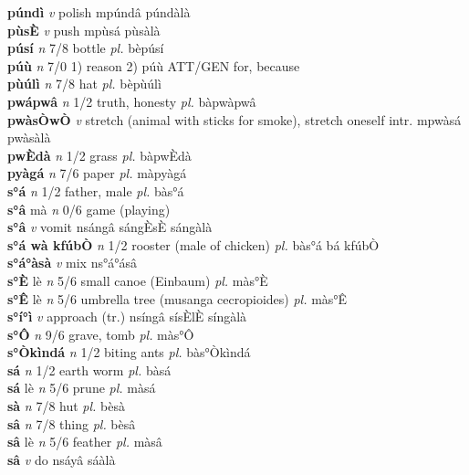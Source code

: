 \documentclass{article}
\begin{document}
{\bf púndì}  {\it v} polish   mpúndâ   púndàlà   \\ 
{\bf pùsÈ}  {\it v} push   mpùsá   pùsàlà   \\ 
{\bf púsí}  {\it n} 7/8 bottle {\it pl.} bèpúsí         \\ 
{\bf púù}  {\it n} 7/0 1) reason 2) púù ATT/GEN for, because         \\ 
{\bf pùúlì}  {\it n} 7/8 hat {\it pl.} bèpùúlì         \\ 
{\bf pwápwâ}  {\it n} 1/2 truth, honesty {\it pl.} bàpwàpwâ         \\ 
{\bf pwàsÒwÒ}  {\it v} stretch (animal with sticks for smoke), stretch oneself intr.   mpwàsá   pwàsàlà   \\ 
{\bf pwÈdà}  {\it n} 1/2 grass {\it pl.} bàpwÈdà         \\ 
{\bf pyàgá}  {\it n} 7/6 paper {\it pl.} màpyàgá         \\ 
{\bf s°á}  {\it n} 1/2 father, male {\it pl.} bàs°á         \\ 
{\bf s°â} mà {\it n} 0/6 game (playing)         \\ 
{\bf s°â}  {\it v} vomit   nsángâ  sángÈsÈ sángàlà   \\ 
{\bf s°á wà kfúbÒ}  {\it n} 1/2 rooster (male of chicken) {\it pl.} bàs°á bá kfúbÒ         \\ 
{\bf s°á°àsà}  {\it v} mix   ns°á°ásâ      \\ 
{\bf s°È} lè {\it n} 5/6 small canoe (Einbaum) {\it pl.} màs°È         \\ 
{\bf s°Ê} lè {\it n} 5/6 umbrella tree (musanga cecropioides) {\it pl.} màs°Ê         \\ 
{\bf s°í°ì}  {\it v} approach (tr.)   nsíngâ sísÈlÈ  síngàlà   \\ 
{\bf s°Ô}  {\it n} 9/6 grave, tomb {\it pl.} màs°Ô         \\ 
{\bf s°Òkìndá}  {\it n} 1/2 biting ants {\it pl.} bàs°Òkìndá         \\ 
{\bf sá}   {\it n} 1/2 earth worm {\it pl.} bàsá         \\ 
{\bf sá} lè {\it n} 5/6 prune {\it pl.} màsá         \\ 
{\bf sà}  {\it n} 7/8 hut {\it pl.} bèsà         \\ 
{\bf sâ}  {\it n} 7/8 thing {\it pl.} bèsâ         \\ 
{\bf sâ} lè {\it n} 5/6 feather {\it pl.} màsâ         \\ 
{\bf sâ}  {\it v} do   nsáyâ   sáàlà   \\ 
\end{document}
